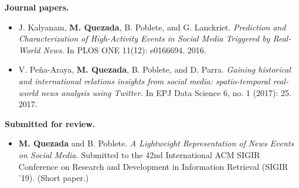 \begin{intro}
{\bf Journal papers.}
\begin{itemize}
    \item J. Kalyanam, {\bf M. Quezada}, B. Poblete, and G. Lanckriet. {\em
     Prediction and Characterization of High-Activity Events in Social Media
     Triggered by Real-World News}. In PLOS ONE 11(12): e0166694. 2016.

    \item V. Peña-Araya, {\bf M. Quezada}, B. Poblete, and D. Parra. {\em
    Gaining historical and international relations insights from social media:
    spatio-temporal real-world news analysis using Twitter.} In EPJ Data Science
    6, no. 1 (2017): 25. 2017.
\end{itemize}

{\bf Submitted for review.}

\begin{itemize}
    \item {\bf M. Quezada} and B. Poblete. {\em A Lightweight Representation of
    News Events on Social Media.} Submitted to the 42nd International ACM SIGIR
    Conference on Research and Development in Information Retrieval (SIGIR '19).
    (Short paper.)
\end{itemize}




\end{intro}